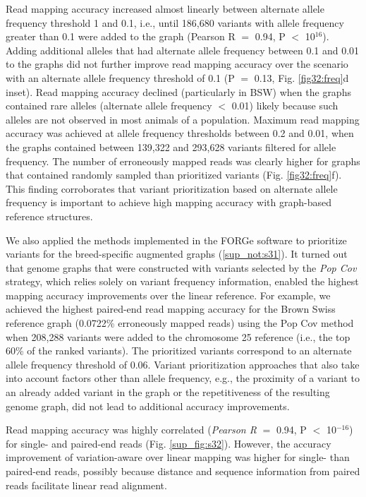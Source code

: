 \documentclass[../main.tex]{subfiles}
\begin{document}
Read mapping accuracy increased almost linearly between alternate allele frequency threshold 1 and 0.1, i.e., until 186,680 variants with allele frequency greater than 0.1 were added to the graph (Pearson R $=$ 0.94, P $<$ 10$^{16}$). Adding additional alleles that had alternate allele frequency between 0.1 and 0.01 to the graphs did not further improve read mapping accuracy over the scenario with an alternate allele frequency threshold of 0.1 (P $=$ 0.13, Fig. \ref{fig32:freq}d inset). Read mapping accuracy declined (particularly in BSW) when the graphs contained rare alleles (alternate allele frequency $<$ 0.01) likely because such alleles are not observed in most animals of a population. Maximum read mapping accuracy was achieved at allele frequency thresholds between 0.2 and 0.01, when the graphs contained between 139,322 and 293,628 variants filtered for allele frequency. The number of erroneously mapped reads was clearly higher for graphs that contained randomly sampled than prioritized variants (Fig. \ref{fig32:freq}f). This finding corroborates that variant prioritization based on alternate allele frequency is important to achieve high mapping accuracy with graph-based reference structures.

We also applied the methods implemented in the FORGe software \citep{pritt2018forge} to prioritize variants for the breed-specific augmented graphs (\ref{sup_not:s31}). It turned out that genome graphs that were constructed with variants selected by the \emph{Pop Cov} strategy, which relies solely on variant frequency information, enabled the highest mapping accuracy improvements over the linear reference. For example, we achieved the highest paired-end read mapping accuracy for the Brown Swiss reference graph (0.0722\% erroneously mapped reads) using the Pop Cov method when 208,288 variants were added to the chromosome 25 reference (i.e., the top 60\% of the ranked variants). The prioritized variants correspond to an alternate allele frequency threshold of 0.06. Variant prioritization approaches that also take into account factors other than allele frequency, e.g., the proximity of a variant to an already added variant in the graph or the repetitiveness of the resulting genome graph, did not lead to additional accuracy improvements.

Read mapping accuracy was highly correlated (\emph{Pearson R} $=$ 0.94, P $<$ 10$^{-16}$) for single- and paired-end reads (Fig. \ref{sup_fig:s32}). However, the accuracy improvement of variation-aware over linear mapping was higher for single- than paired-end reads, possibly because distance and sequence information from paired reads facilitate linear read alignment.
\end{document}
